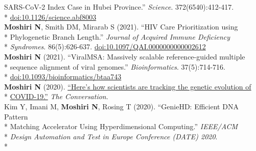 \documentclass[margin,line]{res}
\begin{document}
\begin{resume}
\hspace*{9mm} SARS-CoV-2 Index Case in Hubei Province.'' \textit{Science}. 372(6540):412-417.\\*\vspace{2mm}
\hspace*{8mm} \href{https://doi.org/10.1126/science.abf8003}{doi:10.1126/science.abf8003}\\
\hspace*{4mm} \textbf{Moshiri N}, Smith DM, Mirarab S (2021). ``HIV Care Prioritization using\\*
\hspace*{9mm} Phylogenetic Branch Length.'' \textit{Journal of Acquired Immune Deficiency}\\*\vspace{2mm}
\hspace*{8mm} \textit{Syndromes}. 86(5):626-637. \href{https://doi.org/10.1097/QAI.0000000000002612}{doi:10.1097/QAI.0000000000002612}\\
\hspace*{4mm} \textbf{Moshiri N} (2021). ``ViralMSA: Massively scalable reference-guided multiple\\*
\hspace*{9mm} sequence alignment of viral genomes.'' \textit{Bioinformatics}. 37(5):714-716.\\*\vspace{2mm}
\hspace*{8mm} \href{https://doi.org/10.1093/bioinformatics/btaa743}{doi:10.1093/bioinformatics/btaa743}\\
\hspace*{4mm} \textbf{Moshiri N} (2020). \href{https://theconversation.com/heres-how-scientists-are-tracking-the-genetic-evolution-of-covid-19-134201}{``Here's how scientists are tracking the genetic evolution of}\\*\vspace{2mm}
\hspace*{8mm} \href{https://theconversation.com/heres-how-scientists-are-tracking-the-genetic-evolution-of-covid-19-134201}{COVID-19.''} \textit{The Conversation}.\\
\hspace*{4mm} Kim Y, Imani M, \textbf{Moshiri N}, Rosing T (2020). ``GenieHD: Efficient DNA Pattern\\*
\hspace*{9mm}  Matching Accelerator Using Hyperdimensional Computing.'' \textit{IEEE/ACM}\\*
\hspace*{9mm} \textit{Design Automation and Test in Europe Conference (DATE) 2020}.\\*\vspace{2mm}

\end{resume}
\end{document}
